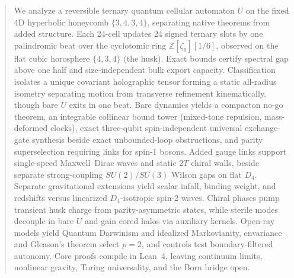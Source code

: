 \begin{abstract}
We analyze a reversible ternary quantum cellular automaton $U$ on the fixed 4D hyperbolic honeycomb $\{3,4,3,4\}$,
separating native theorems from added structure. Each 24-cell updates 24 signed ternary slots by one palindromic beat
over the cyclotomic ring $\mathbb{Z}[\zeta_9][1/6]$, observed on the flat cubic horosphere $\{4,3,4\}$ (the husk).
Exact bounds certify spectral gap above one half and size-independent bulk export capacity. Classification isolates a unique
covariant holographic tensor forming a static all-radius isometry separating motion from transverse refinement
kinematically, though bare $U$ exits in one beat. Bare dynamics yields a compacton no-go theorem, an integrable
collinear bound tower (mixed-tone repulsion, mass-deformed clocks), exact three-qubit spin-independent universal
exchange-gate synthesis beside exact unbounded-loop obstructions, and parity superselection requiring links for spin-1
bosons. Added gauge links support single-speed Maxwell--Dirac waves and static $2T$ chiral walls, beside separate
strong-coupling $SU(2)/SU(3)$ Wilson gaps on flat $D_4$. Separate gravitational extensions yield scalar infall, binding
weight, and redshifts versus linearized $D_4$-isotropic spin-2 waves. Chiral phases pump transient husk charge from
parity-asymmetric states, while sterile modes decouple in bare $U$ and gain cored halos via auxiliary kernels. Open-ray
models yield Quantum Darwinism and idealized Markovianity, envariance and Gleason's theorem select $p{=}2$, and controls
test boundary-filtered autonomy. Core proofs compile in Lean~4, leaving continuum limits, nonlinear gravity, Turing
universality, and the Born bridge open.
\end{abstract}
